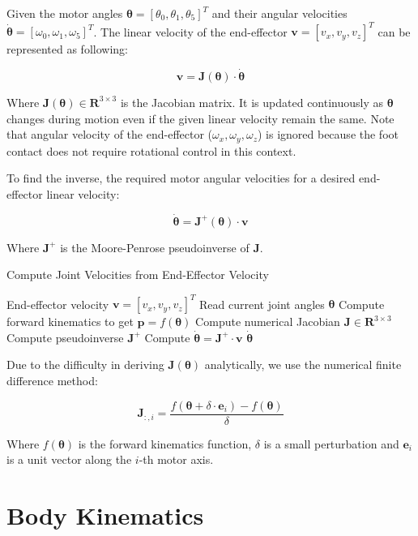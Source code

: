 \documentclass[a4paper,11pt]{article}
\begin{document}
Given the motor angles $\boldsymbol{\theta} = [\theta_0, \theta_1, \theta_5]^T$ and their angular velocities $\dot{\boldsymbol{\theta}} = [\omega_0, \omega_1, \omega_5]^T$. 
The linear velocity of the end-effector $\mathbf{v} = [v_x, v_y, v_z]^T$ can be represented as following:

$$
\mathbf{v} = \mathbf{J}(\boldsymbol{\theta}) \cdot \dot{\boldsymbol{\theta}}
$$

Where $\mathbf{J}(\boldsymbol{\theta}) \in \mathbf{R}^{3 \times 3}$ is the Jacobian matrix. It is updated continuously as $\boldsymbol{\theta}$ 
changes during motion even if the given linear velocity remain the same.
Note that angular velocity of the end-effector ($\omega_x, \omega_y, \omega_z$) is ignored because the foot contact does not require rotational control in this context.

To find the inverse, the required motor angular velocities for a desired end-effector linear velocity:

$$
\dot{\boldsymbol{\theta}} = \mathbf{J}^{+}(\boldsymbol{\theta}) \cdot \mathbf{v}
$$

Where $\mathbf{J}^+$ is the Moore-Penrose pseudoinverse of $\mathbf{J}$.

\begin{algorithm}[H]
	\caption{Compute Joint Velocities from End-Effector Velocity}
	\begin{algorithmic}[1]
		\Require End-effector velocity $\mathbf{v} = [v_x, v_y, v_z]^T$
		\State Read current joint angles $\boldsymbol{\theta}$
		\State Compute forward kinematics to get $\mathbf{p} = f(\boldsymbol{\theta})$
		\State Compute numerical Jacobian $\mathbf{J} \in \mathbf{R}^{3 \times 3}$
		\State Compute pseudoinverse $\mathbf{J}^{+}$
		\State Compute $\dot{\boldsymbol{\theta}} = \mathbf{J}^{+} \cdot \mathbf{v}$
		\State \Return $\dot{\boldsymbol{\theta}}$
	\end{algorithmic}
\end{algorithm}

Due to the difficulty in deriving $\mathbf{J}(\boldsymbol{\theta})$ analytically, we use the numerical finite difference method:

$$
\mathbf{J}_{:,i} = \frac{f(\boldsymbol{\theta} + \delta \cdot \mathbf{e}_i) - f(\boldsymbol{\theta})}{\delta}
$$

Where $f(\boldsymbol{\theta})$ is the forward kinematics function, $\delta$ is a small perturbation and 
$\mathbf{e}_i$ is a unit vector along the $i$-th motor axis.

\section{Body Kinematics}
\end{document}
